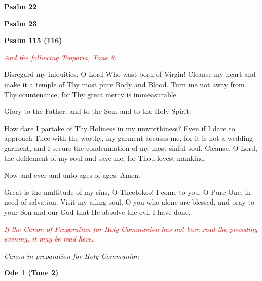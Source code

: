\begin{center}
	\textbf{Psalm 22}
\end{center}




\begin{center}
	\textbf{Psalm 23}
\end{center}




\begin{center}
	\textbf{Psalm 115 (116)}
\end{center}





\textcolor{red}{\textit{And the following Troparia, Tone 8:}}

Disregard my iniquities, O Lord Who wast born of Virgin! Cleanse my heart and make it a temple of Thy most pure Body and Blood. Turn me not away from Thy countenance, for Thy great mercy is immeasurable.

Glory to the Father, and to the Son, and to the Holy Spirit: 

How dare I partake of Thy Holiness in my unworthiness? Even if I dare to approach Thee with the worthy, my garment accuses me, for it is not a wedding-garment, and I secure the condemnation of my most sinful soul. Cleanse, O Lord, the defilement of my soul and save me, for Thou lovest mankind.

Now and ever and unto ages of ages. Amen.

Great is the multitude of my sins, O Theotokos! I come to you, O Pure One, in need of salvation. Visit my ailing soul, O you who alone are blessed, and pray to your Son and our God that He absolve the evil I have done.


\textcolor{red}{\textit{If the Canon of Preparation for Holy Communion has not been read the preceding evening, it may be read here.}}

\begin{center}
\textit{Canon in preparation for Holy Communion}
\end{center}

\begin{center}
\textbf{Ode 1 (Tone 2)}
\end{center}

